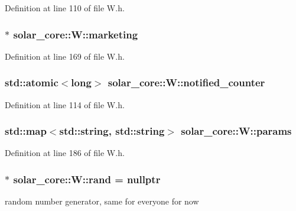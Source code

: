 Definition at line 110 of file W.\+h.

\hypertarget{classsolar__core_1_1_w_a93f277fb3a9d9e7b1e911c6a494c8ec8}{}
\subsubsection[{marketing}]{$\ast$ solar\+\_\+core\+::\+W\+::marketing}\label{classsolar__core_1_1_w_a93f277fb3a9d9e7b1e911c6a494c8ec8}


Definition at line 169 of file W.\+h.

\hypertarget{classsolar__core_1_1_w_afee32d515534826a60ddf12936f85a3d}{}
\subsubsection[{notified\+\_\+counter}]{\setlength{\rightskip}{0pt plus 5cm}std\+::atomic$<$long$>$ solar\+\_\+core\+::\+W\+::notified\+\_\+counter}\label{classsolar__core_1_1_w_afee32d515534826a60ddf12936f85a3d}


Definition at line 114 of file W.\+h.

\hypertarget{classsolar__core_1_1_w_a0d06bc7242f8b3958986118eb217583f}{}
\subsubsection[{params}]{\setlength{\rightskip}{0pt plus 5cm}std\+::map$<$std\+::string, std\+::string$>$ solar\+\_\+core\+::\+W\+::params\hspace{0.3cm}{\ttfamily [protected]}}\label{classsolar__core_1_1_w_a0d06bc7242f8b3958986118eb217583f}


Definition at line 186 of file W.\+h.

\hypertarget{classsolar__core_1_1_w_aa60afb55012cd72e304ac2c133e5a245}{}
\subsubsection[{rand}]{$\ast$ solar\+\_\+core\+::\+W\+::rand = nullptr}\label{classsolar__core_1_1_w_aa60afb55012cd72e304ac2c133e5a245}
random number generator, same for everyone for now 

